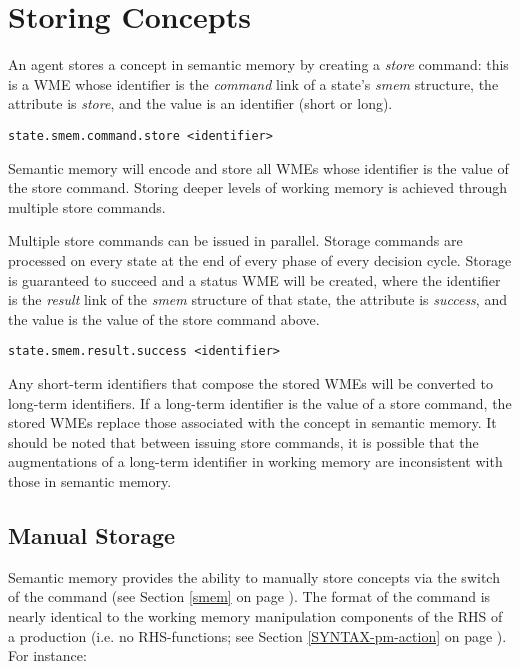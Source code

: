 \section{Storing Concepts}
\label{SMEM-store}

An agent stores a concept in semantic memory by creating a \emph{store} command: this is a WME whose identifier is the \emph{command} link of a state's \emph{smem} structure, the attribute is \emph{store}, and the value is an identifier (short or long).

\begin{verbatim}
state.smem.command.store <identifier>
\end{verbatim}

Semantic memory will encode and store all WMEs whose identifier is the value of the store command.  Storing deeper levels of working memory is achieved through multiple store commands.

Multiple store commands can be issued in parallel.  Storage commands are processed on every state at the end of every phase of every decision cycle.  Storage is guaranteed to succeed and a status WME will be created, where the identifier is the \emph{result} link of the \emph{smem} structure of that state, the attribute is \emph{success}, and the value is the value of the store command above.

\begin{verbatim}
state.smem.result.success <identifier>
\end{verbatim}

Any short-term identifiers that compose the stored WMEs will be converted to long-term identifiers. If a long-term identifier is the value of a store command, the stored WMEs replace those associated with the concept in semantic memory. It should be noted that between issuing store commands, it is possible that the augmentations of a long-term identifier in working memory are inconsistent with those in semantic memory.

\subsection{Manual Storage}
Semantic memory provides the ability to manually store concepts via the  switch of the  command (see Section \ref{smem} on page \pageref{smem}).  The format of the command is nearly identical to the working memory manipulation components of the RHS of a production (i.e. no RHS-functions; see Section \ref{SYNTAX-pm-action} on page \pageref{SYNTAX-pm-action}).  For instance:

